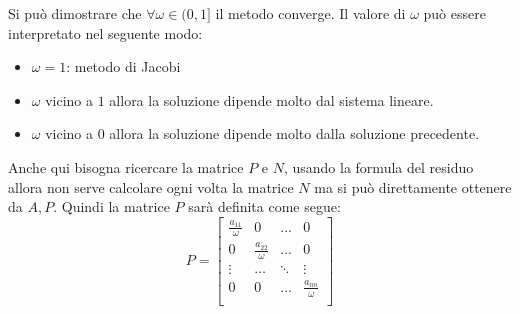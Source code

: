 Si può dimostrare che $\forall \omega \in (0,1]$ il metodo converge. Il valore di
$\omega$ può essere interpretato nel seguente modo:
\begin{itemize}
    \item $\omega = 1$: metodo di Jacobi
    \item $\omega$ vicino a $1$ allora la soluzione dipende molto dal sistema
          lineare.
    \item $\omega$ vicino a $0$ allora la soluzione dipende molto dalla soluzione
          precedente.
\end{itemize}
Anche qui bisogna ricercare la matrice $P$ e $N$, usando la formula del residuo
allora non serve calcolare ogni volta la matrice $N$ ma si può direttamente
ottenere da $A, P$. Quindi la matrice $P$ sarà definita come segue:
\begin{equation*}
    P= \left[\begin{array}{cccc}
            \frac{a_{11}}{\omega} & 0                     & \dots  & 0                     \\
            0                     & \frac{a_{22}}{\omega} & \dots  & 0                     \\
            \vdots                & \dots                 & \ddots & \vdots                \\
            0                     & 0                     & \dots  & \frac{a_{nn}}{\omega} \\
        \end{array}\right]
\end{equation*}
